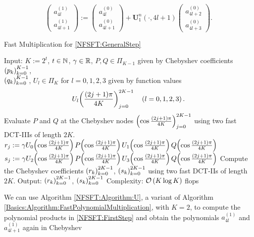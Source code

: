 \begin{equation}
\label{NFSFT:FirstStep}
  \left(\begin{array}{c}
    a_{4l}^{(1)}\\
    a_{4l+1}^{(1)} 
  \end{array}\right)
  :=
  \left(\begin{array}{c}
    a_{4l}^{(0)}\\
    a_{4l+1}^{(0)} 
  \end{array}\right)
  + {\mathbf{U}_{1}^{n}\left(\cdot,4l+1\right)}
  \left(\begin{array}{c}
    a_{4l+2}^{(0)}\\
    a_{4l+3}^{(0)} 
  \end{array}\right).
\end{equation}
\begin{algorithm}[tb]
  \caption{Fast Multiplication for \eqref{NFSFT:GeneralStep}}
  \label{NFSFT:Algorithm:U}
  \begin{algorithmic}
    \STATE Input:  $K := 2^t$, $t \in \mathbb{N}$, $\gamma \in \mathbb{R}$, $P,Q \in \Pi_{K-1}$ given by
       Chebyshev coefficients $\left(p_{k}\right)_{k=0}^{K-1}$,\\
    \STATE {} $\left(q_{k}\right)_{k=0}^{K-1}$, $U_{l} \in \Pi_{K}$ for $l=0,1,2,3$ 
      given by function values
      \[U_{l}{\hspace{-0.4ex}}\left(\frac{(2j+1)\pi}{4K}\right)_{j = 0}^{2K-1} \quad \left(l=0,1,2,3\right).\] 
    \STATE Evaluate $P$ and $Q$ at the Chebyshev nodes $\left(\cos \frac{(2j+1)\pi}{4K}\right)_{j = 0}^{2K-1}$
      using two fast DCT-IIIs of length $2K$.
    \STATE 
      \STATE $r_{j} := \gamma U_{0}{\hspace{-0.4ex}}\left(\cos \frac{(2j+1)\pi}{4K}\right) P{\hspace{-0.4ex}}\left(\cos \frac{(2j+1)\pi}{4K}\right)
        U_{1}{\hspace{-0.4ex}}\left(\cos \frac{(2j+1)\pi}{4K}\right) Q{\hspace{-0.4ex}}\left(\cos \frac{(2j+1)\pi}{4K}\right)$
      \STATE $s_{j} := \gamma U_{2}{\hspace{-0.4ex}}\left(\cos \frac{(2j+1)\pi}{4K}\right) P{\hspace{-0.4ex}}\left(\cos \frac{(2j+1)\pi}{4K}\right)
        U_{3}{\hspace{-0.4ex}}\left(\cos \frac{(2j+1)\pi}{4K}\right) Q{\hspace{-0.4ex}}\left(\cos \frac{(2j+1)\pi}{4K}\right)$
    \ENDFOR
    \STATE
    \STATE Compute the Chebyshev coefficients $\left(r_{k}\right)_{k=0}^{2K-1}$, $\left(s_{k}\right)_{k=0}^{2K-1}$ 
      using two fast DCT-IIs of length $2K$.
    \STATE
    \STATE Output: $\left(r_{k}\right)_{k=0}^{2K-1}$, $\left(s_{k}\right)_{k=0}^{2K-1}$
    \STATE Complexity: $\mathcal{O}\left(K \log K\right)$ flops
  \end{algorithmic}
\end{algorithm}  
We can use Algorithm \ref{NFSFT:Algorithm:U}, a variant of Algorithm 
\ref{Basics:Algorithm:FastPolynomialMultiplication}, with $K=2$, to compute the polynomial products in 
\eqref{NFSFT:FirstStep} and obtain the polynomials $a_{4l}^{(1)}$ and $a_{4l+1}^{(1)}$ again in Chebyshev 
